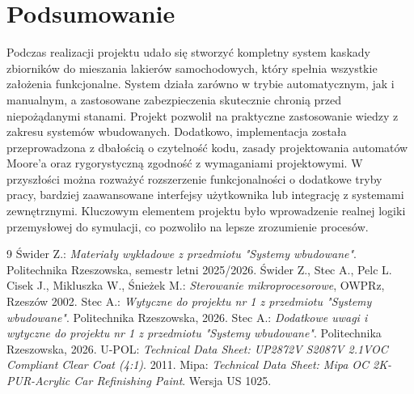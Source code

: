 \documentclass[12pt,oneside]{article}
\begin{document}
\section*{Podsumowanie}
Podczas realizacji projektu udało się stworzyć kompletny system kaskady zbiorników do mieszania lakierów samochodowych, który spełnia wszystkie założenia funkcjonalne. System działa zarówno w trybie automatycznym, jak i manualnym, a zastosowane zabezpieczenia skutecznie chronią przed niepożądanymi stanami. Projekt pozwolił na praktyczne zastosowanie wiedzy z zakresu systemów wbudowanych. Dodatkowo, implementacja została przeprowadzona z dbałością o czytelność kodu, zasady projektowania automatów Moore'a oraz rygorystyczną zgodność z wymaganiami projektowymi. W przyszłości można rozważyć rozszerzenie funkcjonalności o dodatkowe tryby pracy, bardziej zaawansowane interfejsy użytkownika lub integrację z systemami zewnętrznymi. Kluczowym elementem projektu było wprowadzenie realnej logiki przemysłowej do symulacji, co pozwoliło na lepsze zrozumienie procesów.

\begin{thebibliography}{9}
     Świder Z.: \textit{Materiały wykładowe z przedmiotu "Systemy wbudowane"}. Politechnika Rzeszowska, semestr letni 2025/2026.
     Świder Z., Stec A., Pelc L. Cisek J., Mikluszka W., Śnieżek M.: \textit{Sterowanie mikroprocesorowe}, OWPRz, Rzeszów 2002.
     Stec A.: \textit{Wytyczne do projektu nr 1 z przedmiotu "Systemy wbudowane"}. Politechnika Rzeszowska, 2026.
     Stec A.: \textit{Dodatkowe uwagi i wytyczne do projektu nr 1 z przedmiotu "Systemy wbudowane"}. Politechnika Rzeszowska, 2026.
     U-POL: \textit{Technical Data Sheet: UP2872V S2087V 2.1VOC Compliant Clear Coat (4:1)}. 2011.
     Mipa: \textit{Technical Data Sheet: Mipa OC 2K-PUR-Acrylic Car Refinishing Paint}. Wersja US 1025.
\end{thebibliography}
\end{document}
